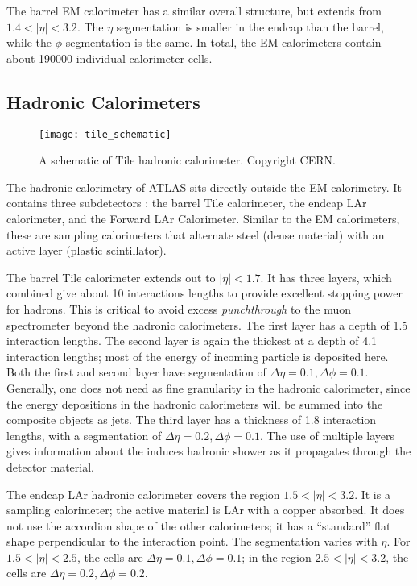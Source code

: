 The barrel EM calorimeter has a similar overall structure, but extends from $1.4 < |\eta| < 3.2$.
The $\eta$ segmentation is smaller in the endcap than the barrel, while the $\phi$ segmentation is the same.
In total, the EM calorimeters contain about 190000 individual calorimeter cells.


\subsection{Hadronic Calorimeters}
\begin{figure}
\caption{A schematic of Tile hadronic calorimeter. Copyright CERN.} \label{fig:tile_schematic}
\texttt{[image: tile\_schematic]}
\end{figure}

The hadronic calorimetry of ATLAS sits directly outside the EM calorimetry.
It contains three subdetectors : the barrel Tile calorimeter, the endcap LAr calorimeter, and the Forward  LAr Calorimeter.
Similar to the EM calorimeters, these are sampling calorimeters that alternate steel (dense material) with an active layer (plastic scintillator).

The barrel Tile calorimeter extends out to $|\eta| < 1.7$.
It has three layers, which combined give about 10 interactions lengths to provide excellent stopping power for hadrons.
This is critical to avoid excess \textit{punchthrough} to the muon spectrometer beyond the hadronic calorimeters.
The first layer has a depth of 1.5 interaction lengths.
The second layer is again the thickest at a depth of 4.1 interaction lengths; most of the energy of incoming particle is deposited here.
Both the first and second layer have segmentation of $\Delta\eta = 0.1, \Delta\phi = 0.1$.
Generally, one does not need as fine granularity in the hadronic calorimeter, since the energy depositions in the hadronic calorimeters will be summed into the composite objects as jets.
The third layer has a thickness of 1.8 interaction lengths, with a segmentation of $\Delta\eta = 0.2, \Delta\phi = 0.1$.
The use of multiple layers gives information about the induces hadronic shower as it propagates through the detector material.

The endcap LAr hadronic calorimeter covers the region $1.5 < |\eta| < 3.2$.
It is a sampling calorimeter; the active material is LAr with a copper absorbed.
It does not use the accordion shape of the other calorimeters; it has a ``standard'' flat shape perpendicular to the interaction point.
The segmentation varies with $\eta$.
For $1.5 < |\eta| < 2.5 $, the cells are $\Delta\eta = 0.1, \Delta\phi = 0.1$; in the region $2.5 < |\eta | < 3.2$, the cells are $\Delta\eta = 0.2, \Delta\phi = 0.2$.

